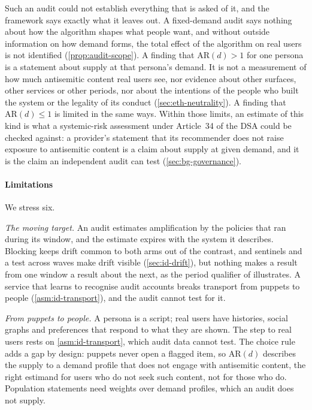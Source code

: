 Such an audit could not establish everything that is asked of it, and the
framework says exactly what it leaves out. A fixed-demand audit says nothing
about how the algorithm shapes what people want, and without outside
information on how demand forms, the total effect of the algorithm on real
users is not identified (\cref{prop:audit-scope}). A finding that
$\mathrm{AR}(d)>1$ for one persona is a statement about supply at that
persona's demand. It is not a measurement of how much antisemitic content
real users see, nor evidence about other surfaces, other services or other
periods, nor about the intentions of the people who built the system or the
legality of its conduct (\cref{sec:eth-neutrality}). A finding that
$\mathrm{AR}(d)\le1$ is limited in the same ways. Within those limits, an
estimate of this kind is what a systemic-risk assessment under Article~34 of
the DSA could be checked against: a provider's statement that its recommender
does not raise exposure to antisemitic content is a claim about supply at
given demand, and it is the claim an independent audit can test
(\cref{sec:bg-governance}).

\paragraph{Limitations}
We stress six.

\emph{The moving target.} An audit estimates amplification by the policies
that ran during its window, and the estimate expires with the system it
describes. Blocking keeps drift common to both arms out of the contrast, and
sentinels and a test across waves make drift visible (\cref{sec:id-drift}),
but nothing makes a result from one window a result about the next, as the
period qualifier of \citet{hosseinmardi2024} illustrates. A service that
learns to recognise audit accounts breaks transport from puppets to people
(\cref{asm:id-transport}), and the audit cannot test for it.

\emph{From puppets to people.} A persona is a script; real users have
histories, social graphs and preferences that respond to what they are shown.
The step to real users rests on \cref{asm:id-transport}, which audit data
cannot test. The choice rule adds a gap by design: puppets never open a
flagged item, so $\mathrm{AR}(d)$ describes the supply to a demand profile
that does not engage with antisemitic content, the right estimand for users
who do not seek such content, not for those who do. Population statements
need weights over demand profiles, which an audit does not supply.

